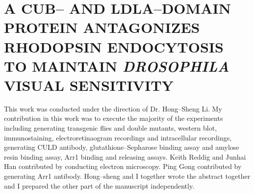 \chapter[A CUB-- AND LDLA--DOMAIN PROTEIN]{A CUB-- AND LDLA--DOMAIN PROTEIN ANTAGONIZES RHODOPSIN ENDOCYTOSIS TO MAINTAIN \textit{DROSOPHILA} VISUAL SENSITIVITY}                     %

This work was conducted under the direction of Dr. Hong--Sheng Li. My contribution in this work was to execute the majority of the experiments including generating transgenic flies and double mutants, western blot, immunostaining, electroretinaogram recordings and intracellular recordings, generating CULD antibody, glutathione--Sepharose binding assay and amylose resin binding assay, Arr1 binding and releasing assays. Keith Reddig and Junhai Han contributed by conducting electron microscopy. Ping Gong contributed by generating Arr1 antibody. Hong--sheng and I together wrote the abstract together and I prepared the other part of the manuscript independently.
\clearpage


